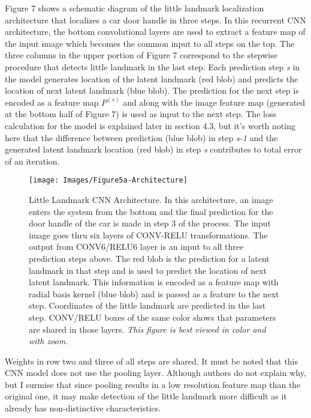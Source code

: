 \documentclass [11pt,letterpaper ,twoside ,openany ]{report}
\begin{document}
    Figure 7 shows a schematic diagram of the little landmark localization architecture that localizes a car door handle in three steps. In this recurrent CNN architecture, the bottom convolutional layers are used to extract a feature map of the input image which becomes the common input to all steps on the top.  The three columns in the upper portion of Figure 7 correspond to the stepwise procedure that detects little landmark in the last step. Each prediction step \textit{s} in the model generates location of the latent landmark (red blob) and predicts the location of next latent landmark (blue blob). The prediction for the next step is encoded as a feature map \(P^{(s)}\) and along with the image feature map (generated at the bottom half of Figure 7) is used as input to the next step. The loss calculation for the model is explained later in section 4.3, but it's worth noting here that the difference between prediction (blue blob) in step \textit {s-1} and the generated latent landmark location (red blob) in step \textit {s} contributes to total error of an iteration.

    \begin{figure}[h!]
      \centering
      \texttt{[image: Images/Figure5a-Architecture]}
      \caption{Little Landmark CNN Architecture. In this architecture, an image enters the system from the bottom and the final prediction for the door handle of the car is made in step 3 of the process. The input image goes thru six layers of CONV-RELU transformations. The output from CONV6/RELU6 layer is an input to all three prediction steps above. The red blob is the prediction for a latent landmark in that step and is used to predict the location of next latent landmark. This information is encoded as a feature map with radial basis kernel (blue blob) and is passed as a feature to the next step. Coordinates of the little landmark are predicted in the last step. CONV/RELU boxes of the same color shows that parameters are shared in those layers. \textit{This figure is best viewed in color and with zoom.}}
      \label{fig:arch}
    \end{figure}            

    Weights in row two and three of all steps are shared. It must be noted that this CNN model does not use the pooling layer. Although authors do not explain why, but I surmise that since pooling results in a low resolution feature map than the original one, it may make detection of the little landmark more difficult as it already has non-distinctive characteristics.
\end{document}
